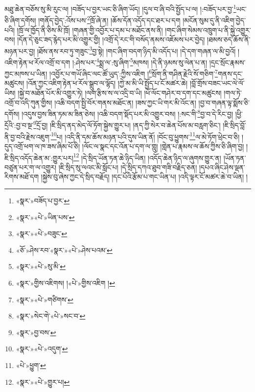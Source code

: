 མཐུ་ཆེན་བཅོས་སུ་མི་རུང་ལ། །བཟོད་པ་བྱར་ཡང་ཅི་ཞིག་ཡོད། །དུལ་བ་ཞི་བའི་སྤྱོད་པ་ལ། །:བཟོད་པར་བྱ་\footnote{«སྣར་»བཟོད་པ་བྱར་}ཡང་ཅི་ཞིག་དགོས། །གནོད་བྱེད་:འོས་པས་\footnote{«སྣར་»«པེ་»ཡིན་པས་}ཁྲོ་ཞེ་ན། །ཆོས་དོན་འདོད་དང་ཐར་པ་དག །མངོན་སུམ་དུ་ནི་འཇིག་བྱེད་པའི། །ཁྲོ་ལ་ཁྱོད་ནི་ཅིས་མི་ཁྲོ། །གཞན་གྱི་འབྱོར་པ་དམ་པ་མཐོང་ནས་ནི། །གང་ཞིག་སེམས་འཁྲུག་པ་ནི་སྐྱེ་འགྱུར་བས། །དོན་དེ་ཅུང་ཟད་རྙེད་པར་མི་འགྱུར་གྱི། །འགྲོ་དེ་རང་གི་བསོད་ནམས་འཇོམས་པར་བྱེད། །ཐམས་ཅད་ཆོས་ནི་མཉན་པར་བྱ། །ཐོས་ནས་རབ་ཏུ་གཟུང་\footnote{«སྣར་»«པེ་»བཟུང་}བྱ་སྟེ། །གང་ཞིག་བདག་ཉིད་མི་འདོད་པ། །དེ་དག་གཞན་ལ་མི་བྱའོ། །འཇིག་རྟེན་ཕ་རོལ་འགྲོ་བ་དག །:ཤེས་པར་\footnote{«ཅོ་»ཤེས་རབ་«སྣར་»«པེ་»ཤེས་པའམ་}སྨྲ་ལ་:སུ་ཞིག་\footnote{«སྣར་»«པེ་»སུ་མི་}མཁས། །དེ་ནི་ཉམས་སུ་ལེན་པ་ན། །དྲང་སྲོང་རྣམས་ཀྱང་མཁས་པ་ཡིན། །འབྱོར་པ་གཡོ་ཞིང་ལང་ཚོ་ཡུད་:ཀྱིས་འཇིག །\footnote{«སྣར་»གྱིས་འཇིགས། །«པེ་»གྱིས་འཇིག །}སྲོག་ནི་གཤིན་རྗེའི་སོ་གཅིག་\footnote{«སྣར་»«པེ་»གཙིགས་}གནས་དང་མཚུངས། །འོན་ཀྱང་འཇིག་རྟེན་ཕ་རོལ་སྒྲུབ་ལ་ལྷོད། །ཀྱེ་མ་མི་ཡི་སྤྱོད་པ་ངོ་མཚར་ཆེ། །བློ་གྲོས་བཟང་ཡང་ལེ་ལོ་ཡིས། །སྐྱེ་བ་མཐོན་པོར་མི་འགྱུར་ཏེ། །ལག་རྩིས་ས་ལ་འདྲི་བ་ཡི། །ཕོ་ལོང་གཤེར་བ་དག་དང་མཚུངས། །གལ་ཏེ་འགྲོ་བ་འདི་ཀུན་གྱིས། །འཆི་བདག་སྤྱི་བོར་གནས་མཐོང་ན། །ཟས་ཀྱང་ཡི་གར་མི་འོང་ན། །བྱ་བ་གཞན་ལྟ་སྨོས་ཅི་དགོས། །འདུས་བྱས་ཟིན་ཏམ་མ་ཟིན་ཅེས། །འཆི་བདག་སྡོད་པར་མི་འགྱུར་བས། །:སང་གི་\footnote{«སྣར་»སེང་གེ་«པེ་»སང་བ་}བྱ་བ་དེ་རིང་བྱ། །ཕྱི་དྲོའི་:བྱ་བ་སྔ་\footnote{«སྣར་»བྱ་བས་}དྲོ་བྱ། །ཇི་སྲིད་ནད་མེད་ལོ་ཏོག་སྐྱེས་གྱུར་པ། །ནད་ཀྱི་སེར་བ་ཆེན་པོས་མ་བརླག་ཅིང་། །ཇི་སྲིད་བློ་ནི་བྱ་བའི་རྗེས་འཇུག་\footnote{«སྣར་»«པེ་»འདུག་}པ། །འདི་ནི་དམ་ཆོས་མཉན་པའི་དུས་ཡིན་ནོ། །བོང་བུ་ཕྱུགས་\footnote{«པེ་»ཕྱུག་}ལ་མེ་ཏོག་ཕྲེང་བ་ཅི། །དུད་འགྲོ་ཕག་ལ་ཁ་ཟས་ཞིམ་པོ་ཅི། །ལོང་ལ་སྣང་དང་འོན་པ་དག་ལ་གླུ། །གླེན་པ་རྣམས་ལ་ཆོས་ཀྱིས་ཅི་ཞིག་བྱ། །ཇི་སྲིད་འདོད་ཆེན་མ་:གྱུར་པར།\footnote{«སྣར་»«པེ་»གྱུར་པ།} །དེ་སྲིད་ཡོན་ཏན་ཆེ་ཉིད་ཡིན། །འདོད་ཆེན་ཉིད་ལ་ཞུགས་གྱུར་ན། །ཡོན་ཏན་བཙུན་པར་ག་ལ་འགྱུར། །ཇི་སྲིད་སུ་ལའང་མི་སློང་པ། །དེ་སྲིད་དཀའ་ཐུབ་གཟི་བརྗིད་ཅན། །དཔའ་ཞིང་ཤེས་ལྡན་རིགས་མཐོ་དག །སྐྱེས་བུ་ཞེས་ཀྱང་དེ་སྲིད་བརྗོད། །དང་པོའི་རྩོམ་པ་གང་ཡིན་པ། །འདི་ལྟར་ངོ་མཚར་ཆེ་བ་ཡིན། །
